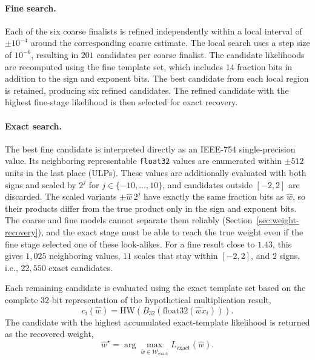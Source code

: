 \documentclass[conference]{IEEEtran}
\begin{document}
\paragraph{Fine search.}
Each of the six coarse finalists is refined independently within a local interval of $\pm 10^{-4}$ around the corresponding coarse estimate.
The local search uses a step size of $10^{-6}$, resulting in $201$ candidates per coarse finalist.
The candidate likelihoods are recomputed using the fine template set, which includes $14$ fraction bits in addition to the sign and exponent bits.
The best candidate from each local region is retained, producing six refined candidates.
The refined candidate with the highest fine-stage likelihood is then selected for exact recovery.

\paragraph{Exact search.}
The best fine candidate is interpreted directly as an IEEE-754 single-precision value.
Its neighboring representable \texttt{float32} values are enumerated within $\pm512$ units in the last place (ULPs).
These values are additionally evaluated with both signs and scaled by $2^j$ for $j\in\{-10,\ldots,10\}$, and candidates outside $[-2,2]$ are discarded.
The scaled variants $\pm\hat{w}\,2^j$ have exactly the same fraction bits as $\hat{w}$, so their products differ from the true product only in the sign and exponent bits.
The coarse and fine models cannot separate them reliably (Section~\ref{sec:weight-recovery}), and the exact stage must be able to reach the true weight even if the fine stage selected one of these look-alikes.
For a fine result close to $1.43$, this gives $1{,}025$ neighboring values, $11$ scales that stay within $[-2,2]$, and $2$ signs, i.e., $22{,}550$ exact candidates.

Each remaining candidate is evaluated using the exact template set based on the complete $32$-bit representation of the hypothetical multiplication result,
\begin{equation*}
	c_i(\hat{w})
	=
	\mathrm{HW}
	\left(
	B_{32}\left(\mathrm{float32}(\hat{w}x_i)\right)
	\right).
\end{equation*}
The candidate with the highest accumulated exact-template likelihood is returned as the recovered weight,
\begin{equation*}
	\hat{w}^{\star}
	=
	\arg\max_{\hat{w}\in\mathcal{W}_{\mathrm{exact}}}
	L_{\mathrm{exact}}(\hat{w}).
\end{equation*}
\end{document}
